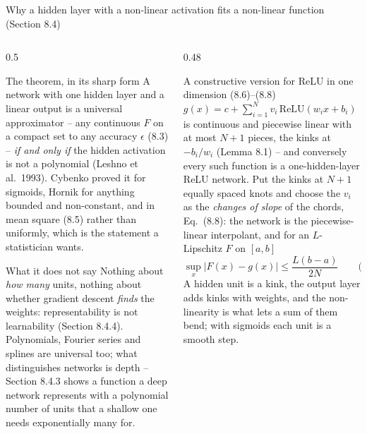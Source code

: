 \documentclass[10pt,aspectratio=169]{beamer}
\begin{document}
\begin{frame}{Why a hidden layer with a non-linear activation fits a non-linear function (Section 8.4)}
\small
\begin{columns}[T]
\begin{column}{0.5\textwidth}
\begin{block}{The theorem, in its sharp form}
\footnotesize
A network with one hidden layer and a linear output is a universal
approximator -- any continuous $F$ on a compact set to any accuracy
$\epsilon$ (8.3) -- \emph{if and only if} the hidden activation is not a
polynomial (Leshno et al.\ 1993).  Cybenko proved it for sigmoids, Hornik for
anything bounded and non-constant, and in mean square (8.5) rather than
uniformly, which is the statement a statistician wants.
\end{block}
\begin{block}{What it does not say}
\footnotesize
Nothing about \emph{how many} units, nothing about whether gradient descent
\emph{finds} the weights: representability is not learnability (Section
8.4.4).  Polynomials, Fourier series and splines are universal too; what
distinguishes networks is depth -- Section 8.4.3 shows a function a deep
network represents with a polynomial number of units that a shallow one
needs exponentially many for.
\end{block}
\end{column}
\begin{column}{0.48\textwidth}
\begin{block}{A constructive version for ReLU in one dimension (8.6)--(8.8)}
\footnotesize
$g(x)=c+\sum_{i=1}^{N}v_i\,\mathrm{ReLU}(w_ix+b_i)$ is continuous and
piecewise linear with at most $N+1$ pieces, the kinks at $-b_i/w_i$ (Lemma
8.1) -- and conversely every such function is a one-hidden-layer ReLU
network.  Put the kinks at $N+1$ equally spaced knots and choose the
$v_i$ as the \emph{changes of slope} of the chords, Eq.~(8.8): the network
is the piecewise-linear interpolant, and for an $L$-Lipschitz $F$ on $[a,b]$
\[
  \sup_x|F(x)-g(x)|\le\frac{L(b-a)}{2N}\qquad\text{(8.7)}.
\]
A hidden unit is a kink, the output layer adds kinks with weights, and the
non-linearity is what lets a sum of them bend; with sigmoids each unit is a
smooth step.
\end{block}
\end{column}
\end{columns}
\end{frame}
\end{document}
